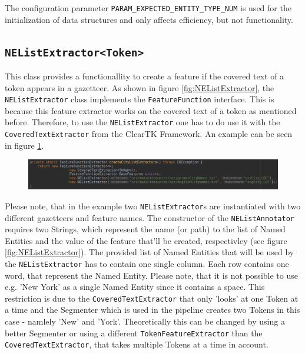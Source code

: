 \documentclass[11pt, english]{article}
\begin{document}
The configuration parameter \verb/PARAM_EXPECTED_ENTITY_TYPE_NUM/ is used for the initialization of data structures and only affects efficiency, but not functionality.

\subsection{\texttt{NEListExtractor<Token>}}
\label{sec:NEListExtractor}
This class provides a functionallity to create a feature if the covered text of a token appears in a gazetteer. As shown in figure \ref{fig:NEListExtractor}, the \verb/NEListExtractor/ class implements the \verb/FeatureFunction/ interface. This is because this feature extractor works on the covered text of a token as mentioned before. Therefore, to use the \verb/NEListExtractor/ one has to do use it with the \verb/CoveredTextExtractor/ from the ClearTK Framework. An example can be seen in figure \ref{fig:NEListExtractorSample}.

\begin{figure}
    \centering
    \includegraphics[width=\linewidth, keepaspectratio]{gfx/createNEListExtractor.png}
    \label{fig:NEListExtractorSample}
\end{figure}

Please note, that in the example two \verb/NEListExtractor/s are instantiated with two different gazetteers and feature names. The constructor of the \verb/NEListAnnotator/ requires two Strings, which represent the name (or path) to the list of Named Entities and the value of the feature that'll be created, respectivley (see figure \ref{fig:NEListExtractor}). The provided list of Named Entities that will be used by the \verb/NEListExtractor/ has to contain one single column. Each row contains one word, that represent the Named Entity. Please note, that it is not possible to use e.g. 'New York' as a single Named Entity since it contains a space. This restriction is due to the \verb/CoveredTextExtractor/ that only 'looks' at one Token at a time and the Segmenter which is used in the pipeline creates two Tokens in this case - namlely 'New' and 'York'. Theoretically this can be changed by using a better Segmenter or using a different \verb/TokenFeatureExtractor/ than the \verb/CoveredTextExtractor/, that takes multiple Tokens at a time in account.
\end{document}
